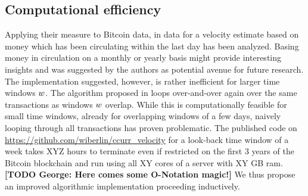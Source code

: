 \subsection{Computational efficiency}
\label{sec:effi}%
Applying their measure to Bitcoin data, in \cite{pernice2019cryptocurrencies} data for a velocity estimate based on money which has been circulating within the last day has been analyzed. %
Basing money in circulation on a monthly or yearly basis might provide interesting insights and was suggested by the authors as potential avenue for future research. %
The implementation suggested, however, is rather inefficient for larger time windows \({w}\). %
The algorithm proposed in \cite{pernice2019cryptocurrencies} loops over-and-over again over the same transactions as windows \({w}\) overlap. %
While this is computationally feasible for small time windows, already for overlapping windows of a few days, naively looping through all transactions has proven problematic. %
The published code on \url{https://github.com/wiberlin/ccurr_velocity} for a look-back time window of a week takes XYZ hours to terminate even if restricted on the first 3 years of the Bitcoin blockchain and run using all XY cores of a server with XY GB ram. 
\textbf{[TODO George: Here comes some O-Notation magic!]}
We thus propose an improved algorithmic implementation proceeding inductively. %

